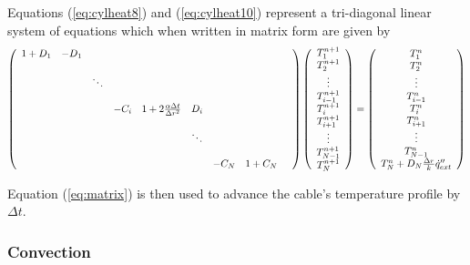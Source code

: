 Equations (\ref{eq:cylheat8}) and (\ref{eq:cylheat10}) represent a
 tri-diagonal linear system of equations which when written in matrix form
are given by
\begin{equation}
\left(
\begin{array}{ccccccccc}
  1+D_1 & -D_1 &  &  &  &  &  &  &  \\
   &  &  &  &  &  &  &  &  \\
   &  &\ddots  &  &  &  &  &  &  \\
   &  &  &  &  &  &  &  &  \\
   &  &  & -C_i &1+2\frac{\alpha\Delta t}{\Delta r^2}  &D_i  &  &  &  \\
   &  &  &  &  &  &  &  &  \\
   &  &  &  &  & \ddots &  &  &  \\
   &  &  &  &  &  &  &  &  \\
   &  &  &  &  &  &-C_N  &1+C_N  &
\end{array}
\right)
\left(
  \begin{array}{c}
    T_1^{n+1}\\
    T_2^{n+1}\\
    \vdots\\
    T_{i-1}^{n+1} \\
    T_i^{n+1} \\
    T_{i+1}^{n+1}\\
    \vdots\\
    T_{N-1}^{n+1}\\
    T_N^{n+1}
  \end{array}
\right)
=
\left(
  \begin{array}{c}
    T_1^{n}\\
    T_2^{n}\\
    \vdots\\
    T_{i-1}^{n} \\
    T_i^{n} \\
    T_{i+1}^{n}\\
    \vdots\\
    T_{N-1}^{n}\\
    T_N^{n}+D_N\frac{\Delta r}{k}\dot{q}''_{ext}
  \end{array}
\right)
\label{eq:matrix}
\end{equation}

\noindent Equation (\ref{eq:matrix}) is then used to
advance the cable's temperature profile by $\Delta t$.

\subsubsection{Convection}

